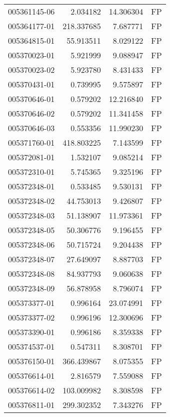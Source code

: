 \begin{tabular}{lrrl}
005361145-06 &    2.034182 &      14.306304 &   FP \\
005364177-01 &  218.337685 &       7.687771 &   FP \\
005364815-01 &   55.913511 &       8.029122 &   FP \\
005370023-01 &    5.921999 &       9.088947 &   FP \\
005370023-02 &    5.923780 &       8.431433 &   FP \\
005370431-01 &    0.739995 &       9.575897 &   FP \\
005370646-01 &    0.579202 &      12.216840 &   FP \\
005370646-02 &    0.579202 &      11.341458 &   FP \\
005370646-03 &    0.553356 &      11.990230 &   FP \\
005371760-01 &  418.803225 &       7.143599 &   FP \\
005372081-01 &    1.532107 &       9.085214 &   FP \\
005372310-01 &    5.745365 &       9.325196 &   FP \\
005372348-01 &    0.533485 &       9.530131 &   FP \\
005372348-02 &   44.753013 &       9.426807 &   FP \\
005372348-03 &   51.138907 &      11.973361 &   FP \\
005372348-05 &   50.306776 &       9.196455 &   FP \\
005372348-06 &   50.715724 &       9.204438 &   FP \\
005372348-07 &   27.649097 &       8.887703 &   FP \\
005372348-08 &   84.937793 &       9.060638 &   FP \\
005372348-09 &   56.878958 &       8.796074 &   FP \\
005373377-01 &    0.996164 &      23.074991 &   FP \\
005373377-02 &    0.996196 &      12.300696 &   FP \\
005373390-01 &    0.996186 &       8.359338 &   FP \\
005374537-01 &    0.547311 &       8.308701 &   FP \\
005376150-01 &  366.439867 &       8.075355 &   FP \\
005376614-01 &    2.816579 &       7.559088 &   FP \\
005376614-02 &  103.009982 &       8.308598 &   FP \\
005376811-01 &  299.302352 &       7.343276 &   FP \\

\end{tabular}
